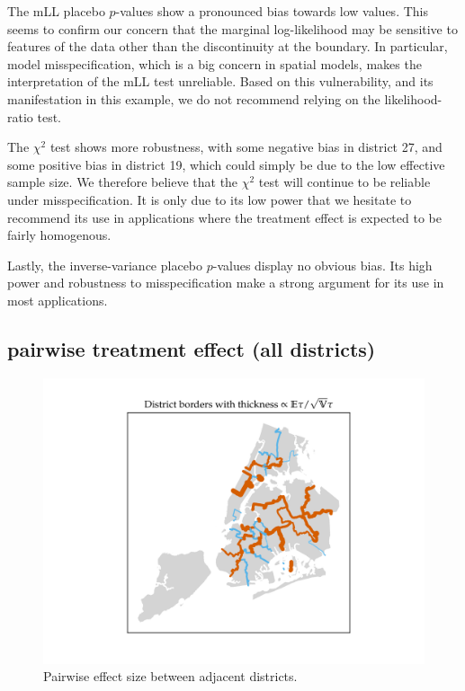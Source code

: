 \documentclass[letter]{article}
\makeatletter
\def\maxwidth{\ifdim\Gin@nat@width>\linewidth\linewidth
\else\Gin@nat@width\fi}
\let\Oldincludegraphics\includegraphics
\renewcommand{\includegraphics}[1]{\Oldincludegraphics[width=1.0\maxwidth]{#1}}
\makeatother
\begin{document}
The mLL placebo \(p\)-values show a pronounced bias towards low values.
This seems to confirm our concern that the marginal log-likelihood may be sensitive to features of the data other than the discontinuity at the boundary.
In particular, model misspecification, which is a big concern in spatial models, makes the interpretation of the mLL test unreliable.
Based on this vulnerability, and its manifestation in this example, we do not recommend relying on the likelihood-ratio test.

The \(\chi^2\) test shows more robustness, with some negative bias in district 27, and some positive bias in district 19, which could simply be due to the low effective sample size.
We therefore believe that the \(\chi^2\) test will continue to be reliable under misspecification.
It is only due to its low power that we hesitate to recommend its use in applications where the treatment effect is expected to be fairly homogenous.

Lastly, the inverse-variance placebo \(p\)-values display no obvious bias.
Its high power and robustness to misspecification make a strong argument
for its use in most applications.
    


    	\subsection{pairwise treatment effect (all districts)}\label{pairwise-treatment-effect-all-districts}

\begin{figure}
\centering
\includegraphics{../NYC/NYC_plots/pairwise_multi.png}
\caption{Pairwise effect size between adjacent districts.}
\end{figure}
    
\end{document}
